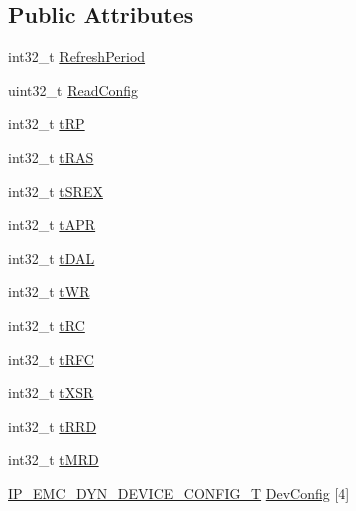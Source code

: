 \subsection*{Public Attributes}
\begin{DoxyCompactItemize}
\item 
int32\+\_\+t \hyperlink{struct_i_p___e_m_c___d_y_n___c_o_n_f_i_g___t_a03ca6da7df623c65e825e0f50079d4fd}{Refresh\+Period}
\item 
uint32\+\_\+t \hyperlink{struct_i_p___e_m_c___d_y_n___c_o_n_f_i_g___t_a2e697f708129b294b03571df19ddcc03}{Read\+Config}
\item 
int32\+\_\+t \hyperlink{struct_i_p___e_m_c___d_y_n___c_o_n_f_i_g___t_a0b410e413e901fcc654b749b832c1c25}{t\+RP}
\item 
int32\+\_\+t \hyperlink{struct_i_p___e_m_c___d_y_n___c_o_n_f_i_g___t_ace29fae2eb32689f775ebf4714f4d6cb}{t\+R\+AS}
\item 
int32\+\_\+t \hyperlink{struct_i_p___e_m_c___d_y_n___c_o_n_f_i_g___t_a75656e8f7ca72b6f524115c3ebca0470}{t\+S\+R\+EX}
\item 
int32\+\_\+t \hyperlink{struct_i_p___e_m_c___d_y_n___c_o_n_f_i_g___t_a548bb451e2329684abaa7ef9ac0e35d5}{t\+A\+PR}
\item 
int32\+\_\+t \hyperlink{struct_i_p___e_m_c___d_y_n___c_o_n_f_i_g___t_a10e060fad500773c96a37f07e7c9f3da}{t\+D\+AL}
\item 
int32\+\_\+t \hyperlink{struct_i_p___e_m_c___d_y_n___c_o_n_f_i_g___t_a85349ffbd8119cc216b53f40ca1e317e}{t\+WR}
\item 
int32\+\_\+t \hyperlink{struct_i_p___e_m_c___d_y_n___c_o_n_f_i_g___t_a6050b4b80b5da6ba14ddb3bc4c9646d1}{t\+RC}
\item 
int32\+\_\+t \hyperlink{struct_i_p___e_m_c___d_y_n___c_o_n_f_i_g___t_a91755f2561ca9d3e77ddbb865bece999}{t\+R\+FC}
\item 
int32\+\_\+t \hyperlink{struct_i_p___e_m_c___d_y_n___c_o_n_f_i_g___t_af36b44006050db4ae7d2fbca93b5aa05}{t\+X\+SR}
\item 
int32\+\_\+t \hyperlink{struct_i_p___e_m_c___d_y_n___c_o_n_f_i_g___t_acf9403d808fa871ac0c99b0fede8c59b}{t\+R\+RD}
\item 
int32\+\_\+t \hyperlink{struct_i_p___e_m_c___d_y_n___c_o_n_f_i_g___t_a2cda56ef4d9c5fab3c8287645eab4dbc}{t\+M\+RD}
\item 
\hyperlink{struct_i_p___e_m_c___d_y_n___d_e_v_i_c_e___c_o_n_f_i_g___t}{I\+P\+\_\+\+E\+M\+C\+\_\+\+D\+Y\+N\+\_\+\+D\+E\+V\+I\+C\+E\+\_\+\+C\+O\+N\+F\+I\+G\+\_\+T} \hyperlink{struct_i_p___e_m_c___d_y_n___c_o_n_f_i_g___t_aba0e0cb7ee73d8fc9af9aaa458332c50}{Dev\+Config} \mbox{[}4\mbox{]}
\end{DoxyCompactItemize}


